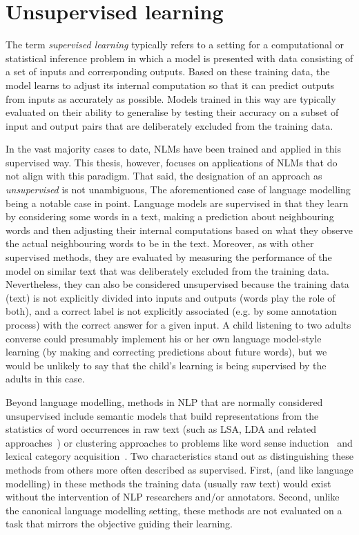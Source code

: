 \section{Unsupervised learning} 

The term \emph{supervised learning} typically refers to a setting for a computational or statistical inference problem in which a model is presented with data consisting of a set of inputs and corresponding outputs. Based on these training data, the model learns to adjust its internal computation so that it can predict outputs from inputs as accurately as possible. Models trained in this way are typically evaluated on their ability to generalise by testing their accuracy on a subset of input and output pairs that are deliberately excluded from the training data. 

In the vast majority cases to date, NLMs have been trained and applied in this supervised way. This thesis, however, focuses on applications of NLMs that do not align with this paradigm. That said, the designation of an approach as \emph{unsupervised} is not unambiguous, The aforementioned case of language modelling being a notable case in point. Language models are supervised in that they learn by considering some words in a text, making a prediction about neighbouring words and then adjusting their internal computations based on what they observe the actual neighbouring words to be in the text. Moreover, as with other supervised methods, they are evaluated by measuring the performance of the model on similar text that was deliberately excluded from the training data. Nevertheless, they can also be considered unsupervised because the training data (text) is not explicitly divided into inputs and outputs (words play the role of both), and a correct label is not explicitly associated (e.g. by some annotation process) with the correct answer for a given input. A child listening to two adults converse could presumably implement his or her own language model-style learning (by making and correcting predictions about future words), but we would be unlikely to say that the child's learning is being supervised by the adults in this case.

Beyond language modelling, methods in NLP that are normally considered unsupervised include semantic models that build representations from the statistics of word occurrences in raw text (such as LSA, LDA and related approaches~\citep{landauer1997solution,blei2012probabilistic}) or clustering approaches to problems like word sense induction~\citep{agirre2007semeval} and lexical category acquisition~\citep{sun2009improving}. Two characteristics stand out as distinguishing these methods from others more often described as supervised. First, (and like language modelling) in these methods the training data (usually raw text) would exist without the intervention of NLP researchers and/or annotators. Second, unlike the canonical language modelling setting, these methods are not evaluated on a task that mirrors the objective guiding their learning. 

